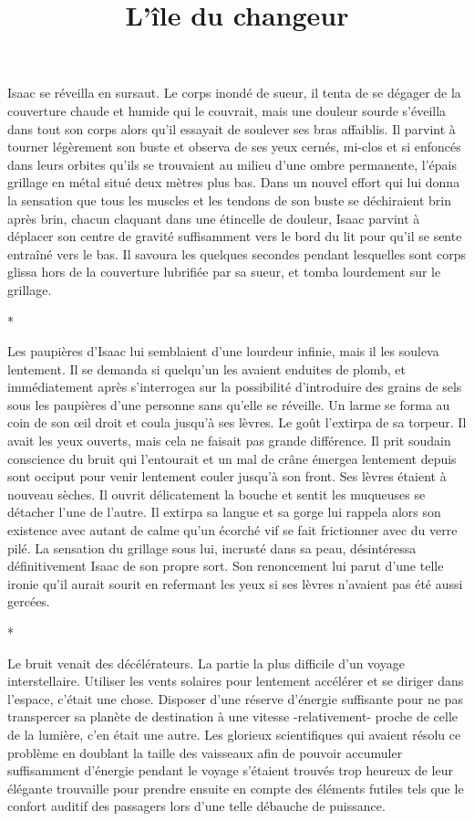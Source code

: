 \documentclass[12pt]{book}
\newcommand{\s}{\begin{center}
*
\end{center}
}
\begin{document}
\title{L'île du changeur}
\maketitle

Isaac se réveilla en sursaut. Le corps inondé de sueur, il tenta de se dégager de la couverture chaude et humide qui le couvrait, mais une douleur sourde s'éveilla dans tout son corps alors qu'il essayait de soulever ses bras affaiblis. Il parvint à tourner légèrement son buste et observa de ses yeux cernés, mi-clos et si enfoncés dans leurs orbites qu'ils se trouvaient au milieu d'une ombre permanente, l'épais grillage en métal situé deux mètres plus bas. Dans un nouvel effort qui lui donna la sensation que tous les muscles et les tendons de son buste se déchiraient brin après brin, chacun claquant dans une étincelle de douleur, Isaac parvint à déplacer son centre de gravité suffisamment vers le bord du lit pour qu'il se sente entraîné vers le bas. Il savoura les quelques secondes pendant lesquelles sont corps glissa hors de la couverture lubrifiée par sa sueur, et tomba lourdement sur le grillage.


\s

Les paupières d'Isaac lui semblaient d'une lourdeur infinie, mais il les souleva lentement. Il se demanda si quelqu'un les avaient enduites de plomb, et immédiatement après s'interrogea sur la possibilité d'introduire des grains de sels sous les paupières d'une personne sans qu'elle se réveille. Un larme se forma au coin de son œil droit et coula jusqu'à ses lèvres. Le goût l'extirpa de sa torpeur. Il avait les yeux ouverts, mais cela ne faisait pas grande différence. Il prit soudain conscience du bruit qui l'entourait et un mal de crâne émergea lentement depuis sont occiput pour venir lentement couler jusqu'à son front. Ses lèvres étaient à nouveau sèches. Il ouvrit délicatement la bouche et sentit les muqueuses se détacher l'une de l'autre. Il extirpa sa langue et sa gorge lui rappela alors son existence avec autant de calme qu'un écorché vif se fait frictionner avec du verre pilé. La sensation du grillage sous lui, incrusté dans sa peau, désintéressa définitivement Isaac de son propre sort. Son renoncement lui parut d'une telle ironie qu'il aurait sourit en refermant les yeux si ses lèvres n'avaient pas été aussi gercées.


\s


Le bruit venait des décélérateurs. La partie la plus difficile d'un voyage interstellaire. Utiliser les vents solaires pour lentement accélérer et se diriger dans l'espace, c'était une chose. Disposer d'une réserve d'énergie suffisante pour ne pas transpercer sa planète de destination à une vitesse -relativement- proche de celle de la lumière, c'en était une autre. Les glorieux scientifiques qui avaient résolu ce problème en doublant la taille des vaisseaux afin de pouvoir accumuler suffisamment d'énergie pendant le voyage s'étaient trouvés trop heureux de leur élégante trouvaille pour prendre ensuite en compte des éléments futiles tels que le confort auditif des passagers lors d'une telle débauche de puissance.
\end{document}
